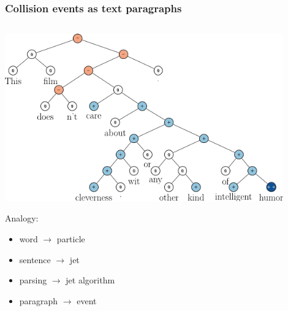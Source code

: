 \documentclass{beamer}
\begin{document}
\begin{frame}
    \frametitle{Collision events as text paragraphs}

    \begin{columns}
        \begin{column}{0.65\textwidth}
            \begin{center}
                \includegraphics[width=0.9\textwidth]{figures/parse-tree.png}
            \end{center}

            {\scriptsize
            Analogy:
            \begin{itemize}
                \item word $\rightarrow$ particle
                \item sentence $\rightarrow$ jet
                \item parsing $\rightarrow$ jet algorithm
                \item paragraph $\rightarrow$ event
            \end{itemize}

}
\end{column}
\end{columns}
\end{frame}
\end{document}
